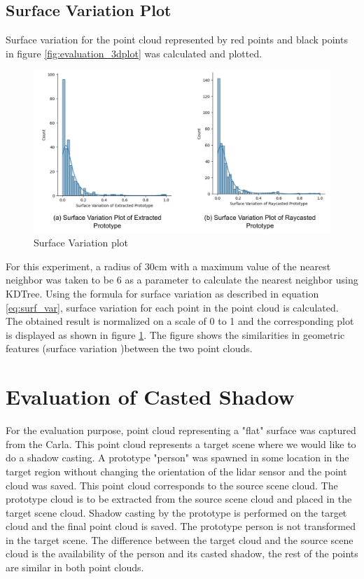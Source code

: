 \subsection{Surface Variation Plot}
Surface variation for the point cloud represented by red points and black points in figure \ref{fig:evaluation_3dplot} was calculated and plotted.

\begin{figure}[htbp]
    \centering
    \includegraphics[width=1\linewidth]{97_graphics/evaluation/sv_plots.pdf}
    \caption{Surface Variation plot}
    \label{fig:evaluation-sv_plots}
\end{figure}

For this experiment, a radius of 30cm with a maximum value of the nearest neighbor was taken to be 6 as a parameter to calculate the nearest neighbor using KDTree. Using the formula for surface variation as described in equation \ref{eq:surf_var}, surface variation for each point in the point cloud is calculated. The obtained result is normalized on a scale of 0 to 1 and the corresponding plot is displayed as shown in figure \ref{fig:evaluation-sv_plots}. The figure shows the similarities in geometric features (surface variation )between the two point clouds.


\section{Evaluation of Casted Shadow}
For the evaluation purpose, point cloud representing a "flat" surface was captured from the Carla. This point cloud represents a target scene where we would like to do a shadow casting. A prototype "person" was spawned in some location in the target region without changing the orientation of the lidar sensor and the point cloud was saved. This point cloud corresponds to the source scene cloud. The prototype cloud is to be extracted from the source scene cloud and placed in the target scene cloud. Shadow casting by the prototype is performed on the target cloud and the final point cloud is saved. The prototype person is not transformed in the target scene. The difference between the target cloud and the source scene cloud is the availability of the person and its casted shadow, the rest of the points are similar in both point clouds.


